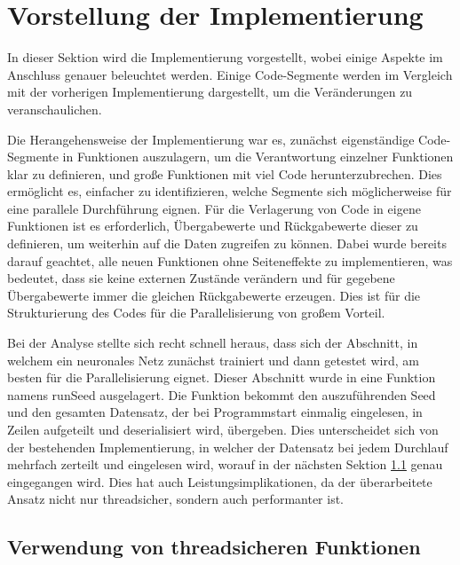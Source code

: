 \section{Vorstellung der Implementierung}
\label{sec:Vorstellung_Implementierung}

In dieser Sektion wird die Implementierung vorgestellt, wobei einige Aspekte im Anschluss genauer beleuchtet werden. Einige Code-Segmente werden im Vergleich mit der vorherigen Implementierung dargestellt, um die Veränderungen zu veranschaulichen.

Die Herangehensweise der Implementierung war es, zunächst eigenständige Code-Segmente in Funktionen auszulagern, um die Verantwortung einzelner Funktionen klar zu definieren, und große Funktionen mit viel Code herunterzubrechen. Dies ermöglicht es, einfacher zu identifizieren, welche Segmente sich möglicherweise für eine parallele Durchführung eignen. Für die Verlagerung von Code in eigene Funktionen ist es erforderlich, Übergabewerte und Rückgabewerte dieser zu definieren, um weiterhin auf die Daten zugreifen zu können. Dabei wurde bereits darauf geachtet, alle neuen Funktionen ohne Seiteneffekte zu implementieren, was bedeutet, dass sie keine externen Zustände verändern und für gegebene Übergabewerte immer die gleichen Rückgabewerte erzeugen. Dies ist für die Strukturierung des Codes für die Parallelisierung von großem Vorteil.

Bei der Analyse stellte sich recht schnell heraus, dass sich der Abschnitt, in welchem ein neuronales Netz zunächst trainiert und dann getestet wird, am besten für die Parallelisierung eignet. Dieser Abschnitt wurde in eine Funktion namens runSeed ausgelagert. Die Funktion bekommt den auszuführenden Seed und den gesamten Datensatz, der bei Programmstart einmalig eingelesen, in Zeilen aufgeteilt und deserialisiert wird, übergeben. Dies unterscheidet sich von der bestehenden Implementierung, in welcher der Datensatz bei jedem Durchlauf mehrfach zerteilt und eingelesen wird, worauf in der nächsten Sektion \ref{sec:Verwendung_threadsichere_Funktionen} genau eingegangen wird. Dies hat auch Leistungsimplikationen, da der überarbeitete Ansatz nicht nur threadsicher, sondern auch performanter ist.

\subsection{Verwendung von threadsicheren Funktionen}
\label{sec:Verwendung_threadsichere_Funktionen}

